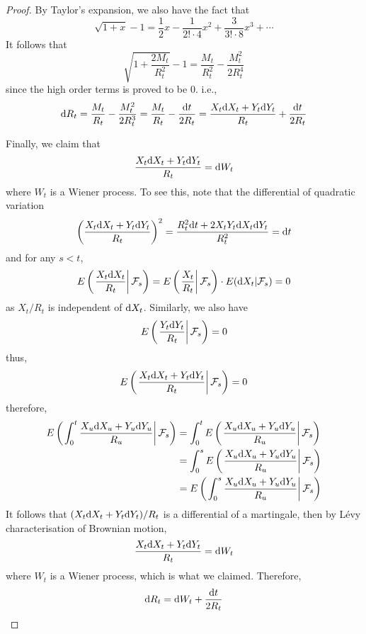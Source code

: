 \documentclass{homework}
\begin{document}
\begin{proof}
        By Taylor's expansion, we also have the fact that
        \[\sqrt{1+x}-1=\frac{1}{2}x-\frac{1}{2!\cdot 4}x^2+\frac{3}{3!\cdot 8}x^3
        +\cdots\]
        It follows that
        \[\sqrt{1+\frac{2M_t}{R_t^2}}-1
        =\frac{M_t}{R_t^2}-\frac{M_t^2}{2R_t^4}\]
        since the high order terms is proved to be 0.
        i.e.,
        \[\mathrm d R_t=\frac{M_t}{R_t}-\frac{M_t^2}{2R_t^3}
        =\frac{M_t}{R_t}-\frac{\mathrm d t}{2R_t}
        =\frac{X_t\mathrm d X_t+Y_t\mathrm d Y_t}{R_t}+\frac{\mathrm d t}{2R_t}\]

        Finally, we claim that
        \[\frac{X_t\mathrm d X_t+Y_t\mathrm d Y_t}{R_t}=\mathrm d W_t\]
        where $W_t$ is a Wiener process. To see this, note that
        the differential of quadratic variation
        \[\left(\frac{X_t\mathrm d X_t+Y_t\mathrm d Y_t}{R_t}\right)^2
        =\frac{R_t^2\mathrm d t+2X_tY_t\mathrm d X_t\mathrm d Y_t}{R_t^2}=\mathrm d t\]
        and for any $s<t$,
        \[E\left(\left.\frac{X_t\mathrm d X_t}{R_t}\right|\mathcal F_s\right)
        =E\left(\left.\frac{X_t}{R_t}\right|\mathcal F_s\right)
        \cdot E(\mathrm d X_t|\mathcal F_s)=0\]
        as $X_t/R_t$ is independent of $\mathrm d X_t$.
        Similarly, we also have
        \[E\left(\left.\frac{Y_t\mathrm d Y_t}{R_t}\right|\mathcal F_s\right)=0\]
        thus,
        \[E\left(\left.\frac{X_t\mathrm d X_t+Y_t\mathrm d Y_t}{R_t}\right|\mathcal F_s\right)=0\]
        therefore,
        \[\begin{aligned}
            E\left(\left.\int_0^t\frac{X_u\mathrm d X_u+Y_u\mathrm d Y_u}{R_u}\right|\mathcal F_s\right)
            &=\int_0^tE\left(\left.\frac{X_u\mathrm d X_u+Y_u\mathrm d Y_u}{R_u}\right|\mathcal F_s\right)\\
            &=\int_0^sE\left(\left.\frac{X_u\mathrm d X_u+Y_u\mathrm d Y_u}{R_u}\right|\mathcal F_s\right)\\
            &=E\left(\left.\int_0^s\frac{X_u\mathrm d X_u+Y_u\mathrm d Y_u}{R_u}\right|\mathcal F_s\right)\\
        \end{aligned}\]
        It follows that $(X_t\mathrm d X_t+Y_t\mathrm d Y_t)/R_t$ is a differential of a
        martingale, then by L\'evy characterisation of Brownian motion,
        \[\frac{X_t\mathrm d X_t+Y_t\mathrm d Y_t}{R_t}=\mathrm d W_t\]
        where $W_t$ is a Wiener process, which is what we claimed.
        Therefore,
        \[\mathrm d R_t=\mathrm d W_t+\frac{\mathrm d t}{2R_t}\]
    \end{proof}

    \appendix
\end{document}

